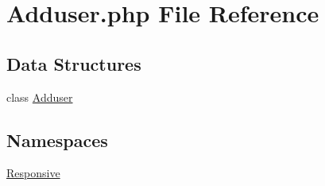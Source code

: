 \hypertarget{_adduser_8php}{}\section{Adduser.\+php File Reference}
\label{_adduser_8php}
\subsection*{Data Structures}
\begin{DoxyCompactItemize}
\item 
class \mbox{\hyperlink{class_responsive_1_1_adduser}{Adduser}}
\end{DoxyCompactItemize}
\subsection*{Namespaces}
\begin{DoxyCompactItemize}
\item 
 \mbox{\hyperlink{namespace_responsive}{Responsive}}
\end{DoxyCompactItemize}
